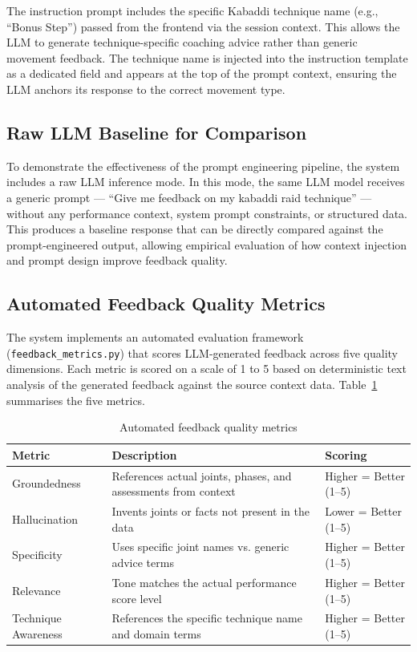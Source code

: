 The instruction prompt includes the specific Kabaddi technique name (e.g., ``Bonus Step'') passed from the frontend via the session context. This allows the LLM to generate technique-specific coaching advice rather than generic movement feedback. The technique name is injected into the instruction template as a dedicated field and appears at the top of the prompt context, ensuring the LLM anchors its response to the correct movement type.


\subsection{Raw LLM Baseline for Comparison}

To demonstrate the effectiveness of the prompt engineering pipeline, the system includes a raw LLM inference mode. In this mode, the same LLM model receives a generic prompt --- ``Give me feedback on my kabaddi raid technique'' --- without any performance context, system prompt constraints, or structured data. This produces a baseline response that can be directly compared against the prompt-engineered output, allowing empirical evaluation of how context injection and prompt design improve feedback quality.


\subsection{Automated Feedback Quality Metrics}

The system implements an automated evaluation framework (\texttt{feedback\_metrics.py}) that scores LLM-generated feedback across five quality dimensions. Each metric is scored on a scale of 1 to 5 based on deterministic text analysis of the generated feedback against the source context data. Table~\ref{tab:feedback_metrics} summarises the five metrics.

\begin{table}[htbp]
\centering
\caption{Automated feedback quality metrics}
\label{tab:feedback_metrics}
\begin{tabular}{|p{3.5cm}|p{7cm}|p{3cm}|}
\hline
\textbf{Metric} & \textbf{Description} & \textbf{Scoring} \\
\hline
Groundedness & References actual joints, phases, and assessments from context & Higher = Better (1--5) \\
\hline
Hallucination & Invents joints or facts not present in the data & Lower = Better (1--5) \\
\hline
Specificity & Uses specific joint names vs. generic advice terms & Higher = Better (1--5) \\
\hline
Relevance & Tone matches the actual performance score level & Higher = Better (1--5) \\
\hline
Technique Awareness & References the specific technique name and domain terms & Higher = Better (1--5) \\
\hline
\end{tabular}
\end{table}


